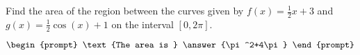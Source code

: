 \documentclass{ximera}
\author{Gregory Hartman \and Matthew Carr}
\begin{document}
\begin{exercise}






Find the area of the region between the curves given by $f(x)=\frac{1}{2}x+3$ and $g(x)=\frac{1}{2}\cos(x)+1$ on the interval $[0,2\pi]$.

\[
\begin{prompt}
\text{The area is } \answer{\pi^2+4\pi}
\end{prompt}
\]


\end{exercise}
\end{document}
